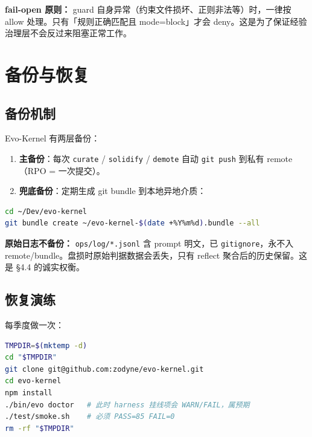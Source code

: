 \documentclass[12pt,a4paper]{ctexart}
\begin{document}
\begin{warnbox}
\textbf{fail-open 原则：} guard 自身异常（约束文件损坏、正则非法等）时，一律按 allow 处理。只有「规则正确匹配且 mode=block」才会 deny。这是为了保证经验治理层不会反过来阻塞正常工作。
\end{warnbox}

\section{备份与恢复}

\subsection{备份机制}

Evo-Kernel 有两层备份：

\begin{enumerate}
  \item \textbf{主备份}：每次 \texttt{curate} / \texttt{solidify} / \texttt{demote} 自动 \texttt{git push} 到私有 remote（RPO = 一次提交）。
  \item \textbf{兜底备份}：定期生成 git bundle 到本地异地介质：
\end{enumerate}

\begin{lstlisting}[language=bash]
cd ~/Dev/evo-kernel
git bundle create ~/evo-kernel-$(date +%Y%m%d).bundle --all
\end{lstlisting}

\begin{redbox}
\textbf{原始日志不备份：} \texttt{ops/log/*.jsonl} 含 prompt 明文，已 \texttt{gitignore}，永不入 remote/bundle。盘损时原始判据数据会丢失，只有 reflect 聚合后的历史保留。这是 §4.4 的诚实权衡。
\end{redbox}

\subsection{恢复演练}

每季度做一次：

\begin{lstlisting}[language=bash]
TMPDIR=$(mktemp -d)
cd "$TMPDIR"
git clone git@github.com:zodyne/evo-kernel.git
cd evo-kernel
npm install
./bin/evo doctor   # 此时 harness 挂线项会 WARN/FAIL，属预期
./test/smoke.sh    # 必须 PASS=85 FAIL=0
rm -rf "$TMPDIR"
\end{lstlisting}
\end{document}
